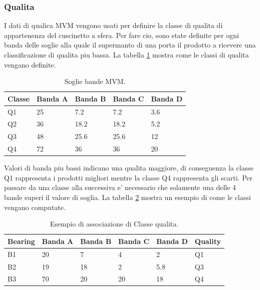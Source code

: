 \subsubsection{Qualita}
I dati di qualica MVM vengono usati per definire la classe di qualita di appartenenza del cuscinetto a sfera. Per fare cio, sono state definite per ogni banda delle soglie alla quale il supermanto di una porta il prodotto a ricevere una classificazione di qualita piu bassa.
La tabella \ref{mvm-soglie} mostra come le classi di qualita vengano definite.

\begin{table}
\caption{\label{mvm-soglie}Soglie bande MVM.}
\centering
\begin{tabular}{|l|l|l|l|l|}
\hline
Classe & \multicolumn{1}{c|}{Banda A} & \multicolumn{1}{c|}{Banda B} & \multicolumn{1}{c|}{Banda C} & \multicolumn{1}{c|}{Banda D} \\ \hline
Q1     & 25                           & 7.2                          & 7.2                          & 3.6                          \\ \hline
Q2     & 36                           & 18.2                         & 18.2                         & 5.2                          \\ \hline
Q3     & 48                           & 25.6                         & 25.6                         & 12                           \\ \hline
Q4     & 72                           & 36                           & 36                           & 20                           \\ \hline
\end{tabular}
\end{table}

Valori di banda piu bassi indicano una qualita maggiore, di conseguenza la classe Q1 rappresenta i prodotti migliori mentre la classe Q4 rappresenta gli scarti. 
Per passare da una classe alla successiva e' necessario che solamente una delle 4 bande superi il valore di soglia. 
La tabella \ref{mvm-esempio} mostra un esempio di come le classi vengano computate.

\begin{table}
\caption{\label{mvm-esempio}Esempio di associazione di Classe qualita.}
\centering
\begin{tabular}{|l|l|l|l|l|l|}
\hline
Bearing & \multicolumn{1}{c|}{Banda A} & \multicolumn{1}{c|}{Banda B} & \multicolumn{1}{c|}{Banda C} & \multicolumn{1}{c|}{Banda D} & Quality \\ \hline
B1      & 20                           & 7                            & 4                            & 2                            & Q1      \\ \hline
B2      & 19                           & 18                           & 2                            & 5.8                          & Q3      \\ \hline
B3      & 70                           & 20                           & 20                           & 18                           & Q4      \\ \hline
\end{tabular}
\end{table}

